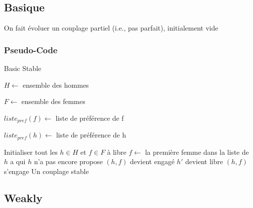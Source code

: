 \documentclass[11pt]{article}
\begin{document}
\subsection{Basique}
On fait évoluer un couplage partiel (i.e., pas parfait), initialement vide
\subsubsection{Pseudo-Code}
\begin{algorithm}
\caption{Basic Stable}
\begin{algorithmic} 
\REQUIRE 
\begin{list}{}{'}
	\item $H \leftarrow$ ensemble des hommes
	\item $F \leftarrow$ ensemble des femmes
    \item $liste_{pref}(f) \leftarrow$ liste de préférence de f
    \item $liste_{pref}(h) \leftarrow$ liste de préférence de h
\end{list}      

\STATE Initialiser tout les $h \in H$ et $f \in F$ à libre
\STATE $f \leftarrow$ la première femme dans la liste de $h$ a qui $h$ n'a pas
encore propose
\STATE $(h, f)$ devient engagé
\STATE $h'$ devient libre
\STATE $(h, f)$ s'engage
\ENDIF
\ENDIF
\ENDWHILE 
\ENSURE Un couplage stable
\end{algorithmic}
\end{algorithm}

\subsection{Weakly}
\end{document}

